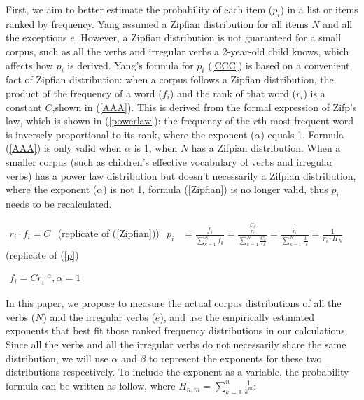 First, we aim to better estimate the probability of each item ($p_i$) in a list or items ranked by frequency. Yang assumed a Zipfian distribution for all items $N$ and all the exceptions $e$. However, a Zipfian distribution is not guaranteed for a small corpus, such as all the verbs and irregular verbs a 2-year-old child knows, which affects how $p_i$ is derived. Yang's formula for $p_i$ (\ref{CCC}) is based on a convenient fact of Zipfian distribution: when a corpus follows a Zipfian distribution, the product of the frequency of a word ($f_i$) and the rank of that word ($r_i$) is a constant $C$,shown in (\ref{AAA}). This is derived from the formal expression of Zifp's law, which is shown in (\ref{powerlaw}): the frequency of the $r$th most frequent word is inversely proportional to its rank, where the exponent ($\alpha$) equals 1. Formula (\ref{AAA}) is only valid when $\alpha$ is 1, when $N$ has a Zifpian distribution. When a smaller corpus (such as children's effective vocabulary of verbs and irregular verbs) has a power law distribution but doesn't necessarily a Zifpian distribution, where the exponent ($\alpha$) is not 1, formula (\ref{Zipfian}) is no longer valid, thus $p_i$ needs to be recalculated. 
\begin{exe}
\ex 
\begin{xlist}
\ex \label{AAA}
$\begin{aligned}
r_i \cdot f_i = C
\end{aligned}$ (replicate of (\ref{Zipfian}))
\ex \label{CCC}
$\begin{aligned}
p_i &  = \frac{f_i}{\displaystyle\sum_{k=1}^N f_k} =\frac{\frac{C_i}{r_i}}{\displaystyle\sum_{k=1}^N \frac{C_k}{r_k}}=\frac{\frac{1}{r_i}}{\displaystyle\sum_{k=1}^N \frac{1}{r_k}}=\frac{1}{r_i\cdot H_N}&
\end{aligned}$ (replicate of (\ref{p})
\end{xlist}
\ex \label{powerlaw}
$\begin{aligned}
f_i = Cr_i^{-\alpha}, \alpha = 1
\end{aligned}$
\end{exe}
In this paper, we propose to measure the actual corpus distributions of all the verbs ($N$) and the irregular verbs ($e$), and use the empirically estimated exponents that best fit those ranked frequency distributions in our calculations. Since all the verbs and all the irregular verbs do not necessarily share the same distribution, we will use $\alpha$ and $\beta$ to represent the exponents for these two distributions respectively. To include the exponent as a variable, the probability formula can be written as follow, where $H_{n,m} = \displaystyle\sum_{k=1}^n \frac{1}{k^m}$:
